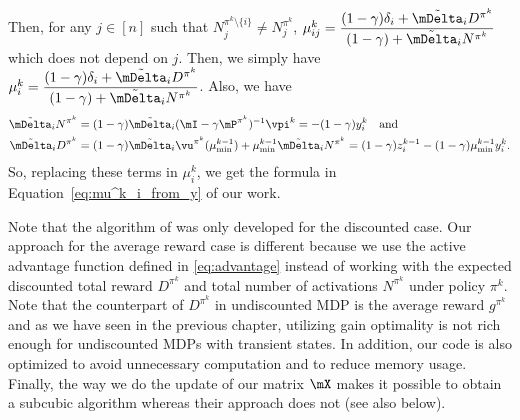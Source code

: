 Then, for any $j\in[n]$ such that $N_j^{\pi^k\setminus\{i\}}\neq N_j^{\pi^k}$, $\mu^k_{ij}=\displaystyle\frac{(1-\gamma)\delta_i +\tilde{\mDelta}_iD^{\pi^k}}{(1-\gamma) +\tilde{\mDelta}_iN^{\pi^k}}$ which does not depend on $j$.
Then, we simply have ${\mu^k_i=\displaystyle\frac{(1-\gamma)\delta_i +\tilde{\mDelta}_iD^{\pi^k}}{(1-\gamma) +\tilde{\mDelta}_iN^{\pi^k}}}$. %
Also, we have 
\begin{align*}
    \tilde{\mDelta}_iN^{\pi^k}&=(1-\gamma)\tilde{\mDelta}_i(\mI-\gamma \mP^{\pi^k})^{-1}\vpi^k=-(1-\gamma)y^k_i \quad\text{and}\\
    \tilde{\mDelta}_iD^{\pi^k}&={(1-\gamma)\tilde{\mDelta}_i\vu^{\pi^k}(\mu^{k-1}_{\min}) +\mu^{k-1}_{\min}\tilde{\mDelta}_i N^{\pi^k}} =(1-\gamma)z^{k-1}_i -(1-\gamma)\mu^{k-1}_{\min}y^k_i.
\end{align*}
So, replacing these terms in $\mu^k_i$, we get the formula in Equation~\eqref{eq:mu^k_i_from_y} of our work.

Note that the algorithm of \cite{akbarzadeh2020conditions} was only developed for the discounted case.  Our approach for the average reward case is different because we use the active advantage function defined in \eqref{eq:advantage} instead of working with the expected discounted total reward $D^{\pi^k}$ and total number of activations $N^{\pi^k}$ under policy $\pi^k$. 
Note that the counterpart of $D^{\pi^k}$ in undiscounted MDP is the average reward $g^{\pi^k}$ and as we have seen in the previous chapter, utilizing gain optimality is not rich enough for undiscounted MDPs with transient states.
In addition, our code is also optimized to avoid unnecessary computation and to reduce memory usage. Finally, the way we do the update of our matrix $\mX$ makes it possible to obtain a subcubic algorithm whereas their approach does not (see also below).

